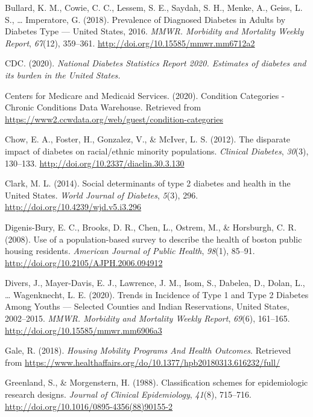 \documentclass [11pt, proquest] {uwthesis}[2015/03/03]
\begin{document}
\hypertarget{ref-Bullard2018}{}
Bullard, K. M., Cowie, C. C., Lessem, S. E., Saydah, S. H., Menke, A.,
Geiss, L. S., \ldots{} Imperatore, G. (2018). Prevalence of Diagnosed
Diabetes in Adults by Diabetes Type --- United States, 2016. \emph{MMWR.
Morbidity and Mortality Weekly Report}, \emph{67}(12), 359--361.
\url{http://doi.org/10.15585/mmwr.mm6712a2}

\hypertarget{ref-CDC2020}{}
CDC. (2020). \emph{National Diabetes Statistics Report 2020. Estimates
of diabetes and its burden in the United States.}

\hypertarget{ref-CMS2020}{}
Centers for Medicare and Medicaid Services. (2020). Condition Categories
- Chronic Conditions Data Warehouse. Retrieved from
\url{https://www2.ccwdata.org/web/guest/condition-categories}

\hypertarget{ref-Chow2012}{}
Chow, E. A., Foster, H., Gonzalez, V., \& McIver, L. S. (2012). The
disparate impact of diabetes on racial/ethnic minority populations.
\emph{Clinical Diabetes}, \emph{30}(3), 130--133.
\url{http://doi.org/10.2337/diaclin.30.3.130}

\hypertarget{ref-Clark2014}{}
Clark, M. L. (2014). Social determinants of type 2 diabetes and health
in the United States. \emph{World Journal of Diabetes}, \emph{5}(3),
296. \url{http://doi.org/10.4239/wjd.v5.i3.296}

\hypertarget{ref-Digenis-Bury2008}{}
Digenis-Bury, E. C., Brooks, D. R., Chen, L., Ostrem, M., \& Horsburgh,
C. R. (2008). Use of a population-based survey to describe the health of
boston public housing residents. \emph{American Journal of Public
Health}, \emph{98}(1), 85--91.
\url{http://doi.org/10.2105/AJPH.2006.094912}

\hypertarget{ref-Divers2020}{}
Divers, J., Mayer-Davis, E. J., Lawrence, J. M., Isom, S., Dabelea, D.,
Dolan, L., \ldots{} Wagenknecht, L. E. (2020). Trends in Incidence of
Type 1 and Type 2 Diabetes Among Youths --- Selected Counties and Indian
Reservations, United States, 2002--2015. \emph{MMWR. Morbidity and
Mortality Weekly Report}, \emph{69}(6), 161--165.
\url{http://doi.org/10.15585/mmwr.mm6906a3}

\hypertarget{ref-Gale2018}{}
Gale, R. (2018). \emph{Housing Mobility Programs And Health Outcomes}.
Retrieved from
\url{https://www.healthaffairs.org/do/10.1377/hpb20180313.616232/full/}

\hypertarget{ref-Greenland1988}{}
Greenland, S., \& Morgenstern, H. (1988). Classification schemes for
epidemiologic research designs. \emph{Journal of Clinical Epidemiology},
\emph{41}(8), 715--716.
\url{http://doi.org/10.1016/0895-4356(88)90155-2}
\end{document}
